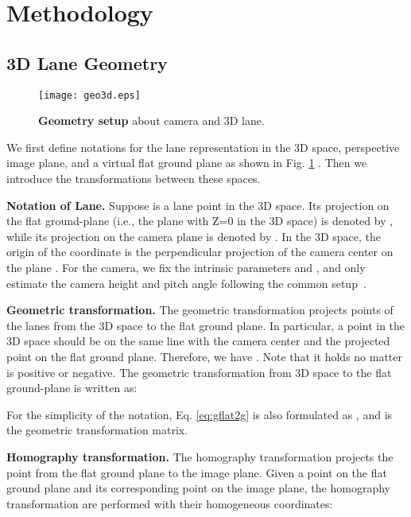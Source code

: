 \documentclass[letterpaper]{article} \usepackage{aaai22}  \usepackage{times}  \usepackage{helvet}  \usepackage{courier}  \usepackage[hyphens]{url}  \usepackage{graphicx} \urlstyle{rm} \def\UrlFont{\rm}  \usepackage{natbib}  \usepackage{caption}
\begin{document}
\section{Methodology}


\subsection{3D Lane Geometry}
\label{subsec:geometry}

\begin{figure}[t]
\begin{center}
\texttt{[image: geo3d.eps]}
\end{center}
\caption{\textbf{Geometry setup} about camera and 3D lane.}
\label{fig:geometry}
\end{figure}

We first define notations for the lane representation in the 3D space, perspective image plane, and a virtual flat ground plane as shown in Fig. \ref{fig:geometry} . Then we introduce the transformations between these spaces. 

\noindent \textbf{Notation of Lane.}
Suppose  is a lane point in the 3D space.  Its projection on the flat ground-plane (i.e.,  the plane with Z=0 in the 3D space) is denoted by , while its projection on the camera plane is denoted by .  In the 3D space,  the origin of the coordinate  is the perpendicular projection of the camera center  on the plane . For the camera, we fix the intrinsic parameters  and , and only estimate the camera height  and pitch angle  following the common setup~\cite{3DLaneNet,GenLaneNet}.


\noindent \textbf{Geometric transformation.}
The geometric transformation projects points of the lanes from the 3D space to the flat ground plane. In particular, a point  in the 3D space should be on the same line with the camera center  and the projected point  on the flat ground plane. Therefore, we have . Note that it holds no matter  is positive or negative. The geometric transformation from 3D space to the flat ground-plane is written as:

For the simplicity of the notation, Eq. \ref{eq:gflat2g} is also formulated as
, and  is the geometric transformation matrix. 

\noindent \textbf{Homography transformation.} 
The homography transformation projects the point from the flat ground plane to the image plane.  Given a point  on the flat ground plane and its corresponding point  on the image plane, the homography transformation are performed with their homogeneous coordinates:
\end{document}

